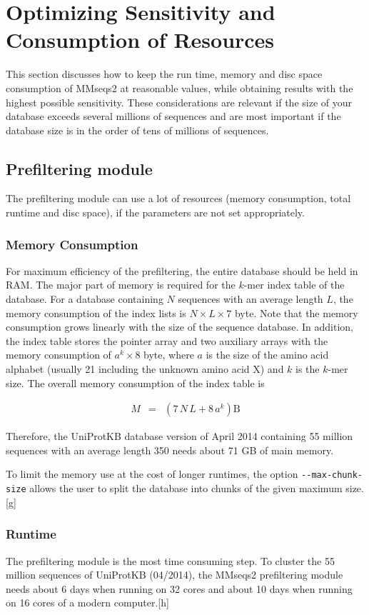 \documentclass[11pt,a4paper]{scrreprt}
\begin{document}
\section{Optimizing Sensitivity and Consumption of Resources} \label{sec:Sensitivity-and-consumption}
This section discusses how to keep the run time, memory and disc space consumption of MMseqs2 at reasonable values, while obtaining results with the highest possible sensitivity. These considerations are relevant if the size of your database exceeds several millions of sequences and are most important if the database size is in the order of tens of millions of sequences.
\subsection{Prefiltering module}
The prefiltering module can use a lot of resources (memory consumption, total runtime and disc space), if the parameters are not set appropriately.
\subsubsection{Memory Consumption}
For maximum efficiency of the prefiltering, the entire database should be held in RAM. The major part of memory is required for the $k$-mer index table of the database. For a database containing $N$ sequences with an average length $L$, the memory consumption of the index lists is $N\times L\times7$ byte. Note that the memory consumption grows linearly with the size of the sequence database. In addition, the index table stores the pointer array and two auxiliary arrays with the memory consumption of $a^{k}\times8$ byte, where $a$ is the size of the amino acid alphabet (usually 21 including the unknown amino acid X) and $k$ is the $k$-mer size. The overall memory consumption of the index table is


\begin{eqnarray*}
M & = & (7\, N\, L+8\, a^{k})\mathrm{B}
\end{eqnarray*}


Therefore, the UniProtKB database version of April 2014 containing 55 million sequences with an average length 350 needs about 71 GB of main memory. 


To limit the memory use at the cost of longer runtimes, the option \texttt{-{}-max-chunk-size} allows the user to split the database into chunks of the given maximum size. [g]
\subsubsection{Runtime}
The prefiltering module is the most time consuming step. To cluster the 55 million sequences of UniProtKB (04/2014), the MMseqs2 prefiltering module needs about 6 days when running on 32 cores and about 10 days when running on 16 cores of a modern computer.[h]
\end{document}
